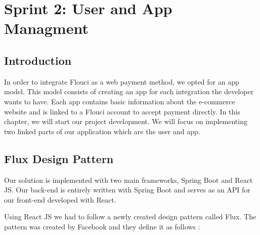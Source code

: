 
\setcounter{chapter}{3}
\chapter{Sprint 2: User and App Managment}
\minitoc %
\graphicspath{{Chapter4/figures/}}

\pagestyle{fancy}
\fancyhf{}
\fancyhead[R]{\bfseries\rightmark}
\fancyfoot[R]{\thepage}
\renewcommand{\headrulewidth}{0.5pt}
\renewcommand{\footrulewidth}{0pt}
\renewcommand{\chaptermark}[1]{\markboth{\MakeUppercase{\chaptername~\thechapter. #1 }}{}}
\renewcommand{\sectionmark}[1]{\markright{\thechapter.\thesection~ #1}}

\begin{spacing}{1.2}

\section*{Introduction}
In order to integrate Flouci as a web payment method, we opted for an app model. This model consists of creating an app for each integration the developer wants to have. Each app contains basic information about the e-commerce website and is linked to a Flouci account to accept payment directly.
\newline
In this chapter, we will start our project development. We will focus on implementing two linked parts of our application which are the user and app.

\section{Flux Design Pattern}
Our solution is implemented with two main frameworks, Spring Boot and React JS.
Our back-end is entirely written with Spring Boot and serves as an API for our front-end developed with React.
\newline

Using React JS we had to follow a newly created design pattern called Flux. The pattern was created by Facebook and they define it as follows :
\newline



\end{spacing}
